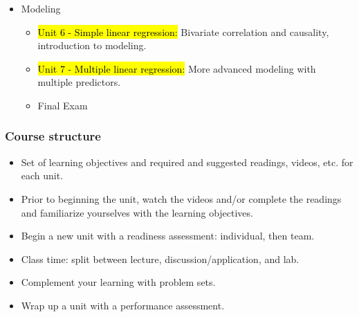 \documentclass[slidestop,compress,mathserif,12pt,t,professionalfonts,xcolor=table]{beamer}
\begin{document}
\begin{frame}[shrink]
\begin{itemize}
\item Modeling
\begin{itemize}
\item \hl{Unit 6 - Simple linear regression:} Bivariate correlation and causality, 
introduction to modeling.
\item \hl{Unit 7 - Multiple linear regression:} More advanced modeling with multiple 
predictors.
\item Final Exam
\end{itemize}

\end{itemize}

\end{frame}


\begin{frame}
\frametitle{Course structure}

\begin{itemize}[<alert@+>]
\item Set of learning objectives and required and suggested readings, videos, etc. for 
each unit.
\item Prior to beginning the unit, watch the videos and/or complete the readings and 
familiarize yourselves with the learning objectives.
\item Begin a new unit with a readiness assessment: individual, then team.
\item Class time: split between lecture, discussion/application, and lab.
\item Complement your learning with problem sets.
\item Wrap up a unit with a performance assessment.
\end{itemize}

\end{frame}

\end{document}
